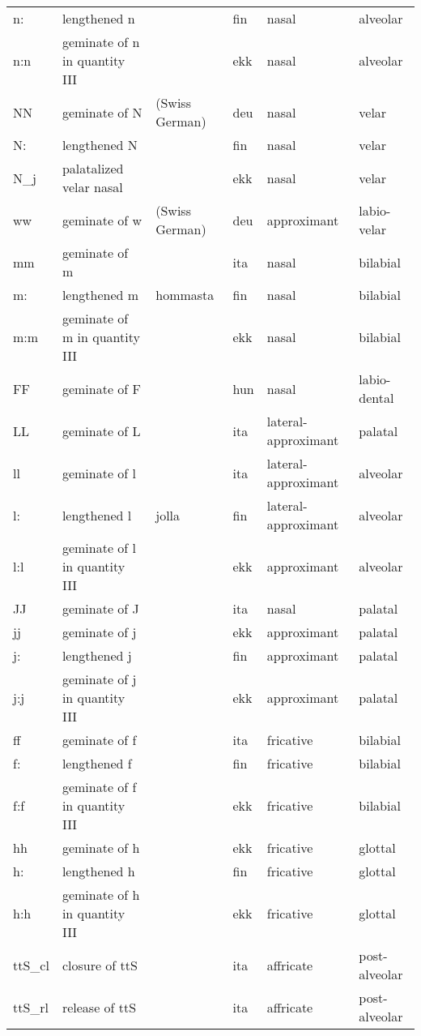 {\begin{longtable}{l|p{.3\linewidth}|p{.15\linewidth}|l|p{.15\linewidth}|l}
	n:	& lengthened n	& 	& fin	& nasal	& alveolar	\\
	n:n	& geminate of n in quantity III	& 	& ekk	& nasal	& alveolar	\\
	NN	& geminate of N	& (Swiss German)	& deu	& nasal	& velar	\\
	N:\	& lengthened N	& 	& fin	& nasal	& velar	\\
	N\_j	& palatalized velar nasal	& 	& ekk	& nasal	& velar	\\
	ww	& geminate of w	& (Swiss German)	& deu	& approximant	& labio-velar	\\
	mm	& geminate of m	& 	& ita	& nasal	& bilabial	\\
	m:	& lengthened m	& hommasta	& fin	& nasal	& bilabial	\\
	m:m	& geminate of m in quantity III	& 	& ekk	& nasal	& bilabial	\\
	FF	& geminate of F	& 	& hun	& nasal	& labio-dental	\\
	LL	& geminate of L	& 	& ita	& lateral-approximant	& palatal	\\
	ll	& geminate of l	& 	& ita	& lateral-approximant	& alveolar	\\
	l:	& lengthened l	& jolla	& fin	& lateral-approximant	& alveolar	\\
	l:l	& geminate of l in quantity III	& 	& ekk	& approximant	& alveolar	\\
	JJ	& geminate of J	& 	& ita	& nasal	& palatal	\\
	jj	& geminate of j	& 	& ekk	& approximant	& palatal	\\
	j:	& lengthened j	& 	& fin	& approximant	& palatal	\\
	j:j	& geminate of j in quantity III	& 	& ekk	& approximant	& palatal	\\
	ff	& geminate of f	& 	& ita	& fricative	& bilabial	\\
	f:	& lengthened f	& 	& fin	& fricative	& bilabial	\\
	f:f	& geminate of f in quantity III	& 	& ekk	& fricative	& bilabial	\\
	hh	& geminate of h	& 	& ekk	& fricative	& glottal	\\
	h:	& lengthened h	& 	& fin	& fricative	& glottal	\\
	h:h	& geminate of h in quantity III	& 	& ekk	& fricative	& glottal	\\
	ttS\_cl	& closure of ttS	& 	& ita	& affricate	& post-alveolar	\\
	ttS\_rl	& release of ttS	& 	& ita	& affricate	& post-alveolar	\\

\end{longtable}}
